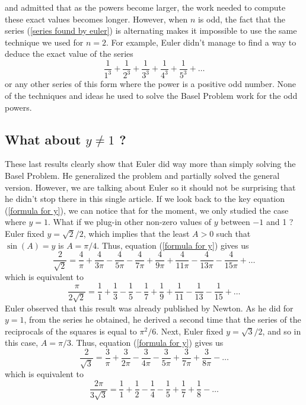 and admitted that as the powers become larger, the work needed to compute these exact values becomes longer. However, when $n$ is odd, the fact that the series (\ref{series found by euler}) is alternating makes it impossible to use the same technique we used for $n=2$. For example, Euler didn't manage to find a way to deduce the exact value of the series
$$\frac{1}{1^3} + \frac{1}{2^3} + \frac{1}{3^3} + \frac{1}{4^3} + \frac{1}{5^3} + \dots$$
or any other series of this form where the power is a positive odd number. None of the techniques and ideas he used to solve the Basel Problem work for the odd powers.

\subsection*{What about $y \neq 1$ ?}
These last results clearly show that Euler did way more than simply solving the Basel Problem. He generalized the problem and partially solved the general version. However, we are talking about Euler so it should not be surprising that he didn't stop there in this single article. If we look back to the key equation (\ref{formula for y}), we can notice that for the moment, we only studied the case where $y=1$. What if we plug-in other non-zero values of $y$ between $-1$ and 1 ? Euler fixed $y = \sqrt{2}/2$, which implies that the least $A > 0$ such that $\sin(A) = y$ is $A = \pi/4$. Thus, equation (\ref{formula for y}) gives us
$$\frac{2}{\sqrt{2}} = \frac{4}{\pi} + \frac{4}{3\pi} - \frac{4}{5\pi} -\frac{4}{7\pi} + \frac{4}{9\pi} + \frac{4}{11\pi} - \frac{4}{13\pi} - \frac{4}{15\pi} + \dots$$
which is equivalent to
\begin{equation} \label{Newton series}
    \frac{\pi}{2\sqrt{2}} = \frac{1}{1} + \frac{1}{3} - \frac{1}{5} - \frac{1}{7} + \frac{1}{9} + \frac{1}{11} - \frac{1}{13} - \frac{1}{15} + \dots
\end{equation}
Euler observed that this result was already published by Newton. As he did for $y = 1$, from the series he obtained, he derived a second time that the series of the reciprocals of the squares is equal to $\pi^2/6$. Next, Euler fixed $y = \sqrt{3}/2$, and so in this case, $A = \pi/3$. Thus, equation (\ref{formula for y}) gives us
$$\frac{2}{\sqrt{3}} = \frac{3}{\pi} + \frac{3}{2\pi} - \frac{3}{4\pi} - \frac{3}{5\pi} + \frac{3}{7\pi} + \frac{3}{8\pi} - \dots$$
which is equivalent to
\begin{equation} \label{series 2pi/3 sqrt 3}
    \frac{2\pi}{3\sqrt{3}} = \frac{1}{1} + \frac{1}{2} - \frac{1}{4} - \frac{1}{5} + \frac{1}{7} + \frac{1}{8} - \dots
\end{equation}
